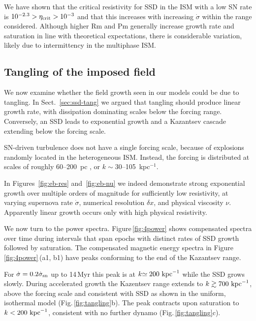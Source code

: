 \documentclass[preprint2]{aastex63}
\newcommand\SNr{\dot\sigma_{\rm sn}}
\newcommand\kpc{~ {\rm kpc}}
\newcommand\dx{ {\delta x}}
\begin{document}
 {We have shown that the critical resistivity for SSD in the ISM with a
 low SN rate is $10^{-2.3}>\eta_{\rm crit}>10^{-3}$ and
 that this increases with increasing
 $\dot\sigma$ within the range considered.
 Although higher Rm and Pm generally increase growth rate
 and saturation
 in line with theoretical expectations,
 there is considerable variation, likely due to intermittency in
   the multiphase ISM.}
 
 
\subsection{{Tangling of the imposed field}} \label{sec:Balsara}

{We now examine whether the field growth seen in our models could
  be due to tangling.
  In Sect.~\ref{sec:ssd-tang} we argued that tangling should produce linear
  growth rate, with dissipation dominating scales below the forcing range.
  Conversely, an SSD leads to exponential growth and a Kazantsev cascade
  extending below the forcing scale.}

 SN-driven turbulence does not have a {single} forcing scale, 
 because of {explosions randomly located in} the heterogeneous ISM.
 {Instead, the} forcing {is} distributed at scales {of roughly 
 60--200~pc
   \citep{joung2006,avillez2007,HSSFG17}, or $k \sim 30$--105~kpc$^{-1}$}.

 {In {Figures~\ref{fig:eb-res} and~\ref{fig:eb-nu}} we indeed
 demonstrate strong exponential growth over multiple orders of magnitude
 {for sufficiently low resistivity, at varying supernova} rate $\dot\sigma$,
 numerical resolution $\dx$, and physical viscosity $\nu$. 
 {Apparently l}inear growth {occurs only} with high physical resistivity.}

 {We now turn to the power spectra. Figure\,\ref{fig:4power} shows
 compensated spectra over time during {intervals} that}
 {span epochs with distinct rates of SSD  growth followed by saturation.}
 The compensated magnetic energy spectra in Figure\,\ref{fig:4power}\,(a1, b1)
 have {peaks conforming to the end of the Kazantsev range.}

 {For ${\dot\sigma=0.2\SNr}$ up to 14\,Myr this peak is at
 $k{\simeq200}\kpc^{-1}$ while the
 SSD grows {slowly}.
 During accelerated growth the Kazentsev range extends to}
 $k\gtrsim{700}\kpc^{-1}$, above the forcing scale and consistent
 with SSD {as shown in the uniform, isothermal model}
 (Fig.\,\ref{fig:tangling}b).
 The peak contracts upon saturation to $k<{200}\kpc^{-1}$, consistent with no
 {further} dynamo (Fig.\,\ref{fig:tangling}c).
\end{document}
